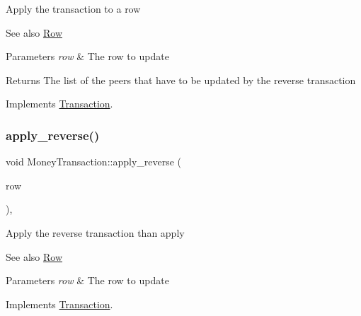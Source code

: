 Apply the transaction to a row \begin{DoxySeeAlso}{See also}
\mbox{\hyperlink{classRow}{Row}}
\end{DoxySeeAlso}

\begin{DoxyParams}{Parameters}
{\em row} & The row to update \\
\hline
\end{DoxyParams}
\begin{DoxyReturn}{Returns}
The list of the peers that have to be updated by the reverse transaction 
\end{DoxyReturn}


Implements \mbox{\hyperlink{classTransaction_a6ea269280c8cc641878f6e5775f270ca}{Transaction}}.

\mbox{\label{classMoneyTransaction_a9eaa71eed1cc8b06ef5773c76c814ad9}} 
\subsubsection{\texorpdfstring{apply\+\_\+reverse()}{apply\_reverse()}}
{\footnotesize\ttfamily void Money\+Transaction\+::apply\+\_\+reverse (\begin{DoxyParamCaption}\item[{\mbox{\hyperlink{classRow}{Row}} $\ast$}]{row }\end{DoxyParamCaption})\hspace{0.3cm}{\ttfamily [override]}, {\ttfamily [virtual]}}

Apply the reverse transaction than apply \begin{DoxySeeAlso}{See also}
\mbox{\hyperlink{classRow}{Row}}
\end{DoxySeeAlso}

\begin{DoxyParams}{Parameters}
{\em row} & The row to update \\
\hline
\end{DoxyParams}


Implements \mbox{\hyperlink{classTransaction_a1ef3b245f37c217f50f8f76fceebca4a}{Transaction}}.

\mbox{\label{classMoneyTransaction_af777b46f577df3c089a44c78c1aebc40}} 
